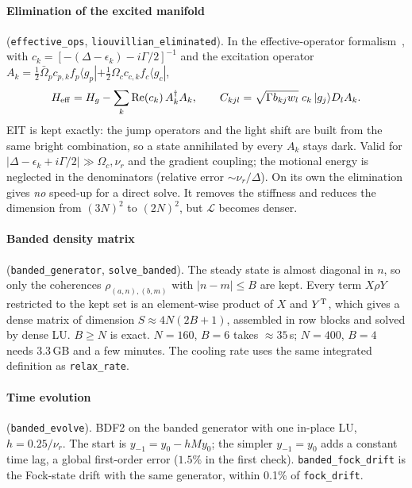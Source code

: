 \documentclass[11pt,a4paper]{article}
\newcommand{\ket}[1]{|#1\rangle}
\newcommand{\bra}[1]{\langle #1|}
\newcommand{\Om}{\Omega}
\newcommand{\code}[1]{\texttt{#1}}
\begin{document}
\paragraph{Elimination of the excited manifold} (\code{effective\_ops}, \code{liouvillian\_eliminated}). In the effective-operator formalism~\cite{reiter2012}, with $c_k=[-(\Delta-\epsilon_k)-i\Gamma/2]^{-1}$ and the excitation operator $A_k=\tfrac12\bar\Om_pc_{p,k}f_p\bra{g_p}+\tfrac12\Om_cc_{c,k}f_c\bra{g_c}$,
\begin{equation}
  H_{\rm eff}=H_g-\sum_k{\rm Re}(c_k)\,A_k^\dagger A_k,\qquad C_{kjl}=\sqrt{\Gamma b_{kj}w_l}\;c_k\,\ket{g_j}D_lA_k .
\end{equation}
EIT is kept exactly: the jump operators and the light shift are built from the same bright combination, so a state annihilated by every $A_k$ stays dark. Valid for $|\Delta-\epsilon_k+i\Gamma/2|\gg\Om_c,\nu_r$ and the gradient coupling; the motional energy is neglected in the denominators (relative error $\sim\nu_r/\Delta$). On its own the elimination gives \emph{no} speed-up for a direct solve. It removes the stiffness and reduces the dimension from $(3N)^2$ to $(2N)^2$, but $\mathcal L$ becomes denser.

\paragraph{Banded density matrix} (\code{banded\_generator}, \code{solve\_banded}). The steady state is almost diagonal in $n$, so only the coherences $\rho_{(a,n),(b,m)}$ with $|n-m|\le B$ are kept. Every term $X\rho Y$ restricted to the kept set is an element-wise product of $X$ and $Y^{\rm T}$, which gives a dense matrix of dimension $S\approx4N(2B+1)$, assembled in row blocks and solved by dense LU. $B\ge N$ is exact. $N=160$, $B=6$ takes $\approx35$\,s; $N=400$, $B=4$ needs 3.3\,GB and a few minutes. The cooling rate uses the same integrated definition as \code{relax\_rate}.

\paragraph{Time evolution} (\code{banded\_evolve}). BDF2 on the banded generator with one in-place LU, $h=0.25/\nu_r$. The start is $y_{-1}=y_0-hMy_0$; the simpler $y_{-1}=y_0$ adds a constant time lag, a global first-order error ($1.5\%$ in the first check). \code{banded\_fock\_drift} is the Fock-state drift with the same generator, within 0.1\% of \code{fock\_drift}.
\end{document}
